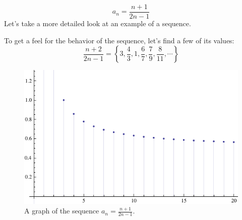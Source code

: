 \begin{ex}\label{ex:bigsequence}
  \[ a_n=\frac{n+1}{2n-1} \]
    Let's take a more detailed look at an example of a sequence.

    To get a feel for the behavior of the sequence, let's find a few of its
    values:
    \[ \frac{n+2}{2n-1} =
      \left\{3,\frac{4}{3},1,\frac{6}{7},\frac{7}{9},\frac{8}{11}, \cdots \right\} \]
    \begin{figure}[h]
      \begin{center}
        \includegraphics{graphs/np22nm1.pdf}
      \end{center}
      \caption{A graph of the sequence $ a_n=\frac{n+1}{2n-1} $.}
    \end{figure}


\end{ex}
